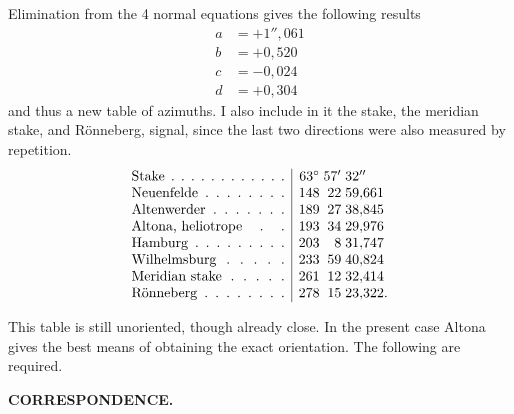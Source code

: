 Elimination from the 4 normal equations gives the following results
\[
\begin{aligned}
 a&=+1''{,}061\\
 b&=+0{,}520\\
 c&=-0{,}024\\
 d&=+0{,}304
\end{aligned}
\]
and thus a new table of azimuths. I also include in it the stake, the meridian stake, and Rönneberg, signal, since the last two directions were also measured by repetition.
\[
\begin{array}{@{}l|r@{\;}r@{\;}l@{}}
 \text{\hbox to 11em{Stake\hfil.\hfil.\hfil.\hfil.\hfil.\hfil.\hfil.\hfil.\hfil.\hfil.\hfil.\hfil.}}&63^\circ&57'&32''\\
 \text{\hbox to 11em{Neuenfelde\hfil.\hfil.\hfil.\hfil.\hfil.\hfil.\hfil.\hfil.}}&148&22&59{,}661\\
 \text{\hbox to 11em{Altenwerder\hfil.\hfil.\hfil.\hfil.\hfil.\hfil.\hfil.}}&189&27&38{,}845\\
 \text{\hbox to 11em{Altona, heliotrope\hfil.\hfil.}}&193&34&29{,}976\\
 \text{\hbox to 11em{Hamburg\hfil.\hfil.\hfil.\hfil.\hfil.\hfil.\hfil.\hfil.\hfil.}}&203&8&31{,}747\\
 \text{\hbox to 11em{Wilhelmsburg\hfil.\hfil.\hfil.\hfil.\hfil.}}&233&59&40{,}824\\
 \text{\hbox to 11em{Meridian stake\hfil.\hfil.\hfil.\hfil.\hfil.}}&261&12&32{,}414\\
 \text{\hbox to 11em{Rönneberg\hfil.\hfil.\hfil.\hfil.\hfil.\hfil.\hfil.\hfil.}}&278&15&23{,}322.
\end{array}
\]

This table is still unoriented, though already close. In the present case Altona gives the best means of obtaining the exact orientation. The following are required.

\par\clearpage
\noindent{}\hfill{\small\textbf{CORRESPONDENCE.}}\hfill\null\par\medskip


